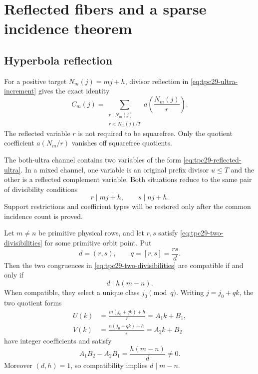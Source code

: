 \section{Reflected fibers and a sparse incidence theorem}
\label{sec:tpc29-reflected-incidence}

\subsection{Hyperbola reflection}

For a positive target $N_m(j)=mj+h$, divisor reflection in
\eqref{eq:tpc29-ultra-increment} gives the exact identity
\begin{equation}
 C_m(j)=
 \sum_{\substack{r\mid N_m(j)\\r<N_m(j)/T}}
 a\!\left(\frac{N_m(j)}r\right).
 \label{eq:tpc29-reflected-ultra}
\end{equation}
The reflected variable $r$ is not required to be squarefree.  Only the
quotient coefficient $a(N_m/r)$ vanishes off squarefree quotients.

The both-ultra channel contains two variables of the form
\eqref{eq:tpc29-reflected-ultra}.  In a mixed channel, one variable is
an original prefix divisor $u\le T$ and the other is a reflected
complement variable.  Both situations reduce to the same pair of
divisibility conditions
\begin{equation}
 r\mid mj+h,\qquad s\mid nj+h.
 \label{eq:tpc29-two-divisibilities}
\end{equation}
Support restrictions and coefficient types will be restored only
after the common incidence count is proved.

\begin{lemma}
\label{lem:tpc29-reflected-crt}
Let $m\ne n$ be primitive physical rows, and let $r,s$ satisfy
\eqref{eq:tpc29-two-divisibilities} for some primitive orbit point.
Put
\begin{equation}
 d=(r,s),\qquad q=[r,s]=\frac{rs}{d}.
 \label{eq:tpc29-dq}
\end{equation}
Then the two congruences in \eqref{eq:tpc29-two-divisibilities} are
compatible if and only if
\begin{equation}
 d\mid h(m-n).
 \label{eq:tpc29-compatibility}
\end{equation}
When compatible, they select a unique class $j_0\pmod q$.  Writing
$j=j_0+qk$, the two quotient forms
\begin{align}
 U(k)&=\frac{m(j_0+qk)+h}{r}=A_1k+B_1,
 \label{eq:tpc29-U-form}\\
 V(k)&=\frac{n(j_0+qk)+h}{s}=A_2k+B_2
 \label{eq:tpc29-V-form}
\end{align}
have integer coefficients and satisfy
\begin{equation}
 \boxed{A_1B_2-A_2B_1=\frac{h(m-n)}d\ne0.}
 \label{eq:tpc29-affine-determinant}
\end{equation}
Moreover $(d,h)=1$, so compatibility implies $d\mid m-n$.
\end{lemma}

